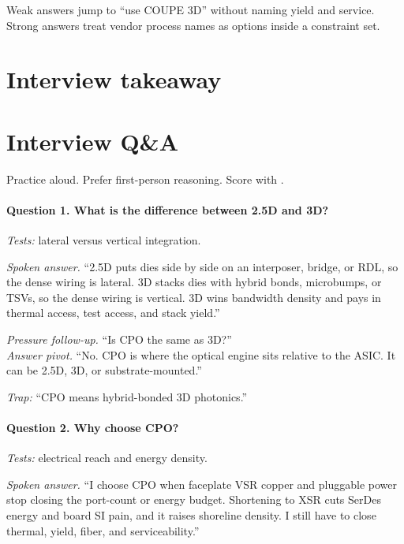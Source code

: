 Weak answers jump to ``use COUPE 3D'' without naming yield and service. Strong
answers treat vendor process names as options inside a constraint set.

\section{Interview takeaway}
\label{sec:pkg-design-review}


\section{Interview Q\&A}
\label{sec:pkg-interview-qa}

Practice aloud. Prefer first-person reasoning. Score with
.

\paragraph{Question 1. What is the difference between 2.5D and 3D?}
\textit{Tests:} lateral versus vertical integration.

\textit{Spoken answer.}
``2.5D puts dies side by side on an interposer, bridge, or RDL, so the dense
wiring is lateral. 3D stacks dies with hybrid bonds, microbumps, or TSVs, so
the dense wiring is vertical. 3D wins bandwidth density and pays in thermal
access, test access, and stack yield.''

\textit{Pressure follow-up.} ``Is CPO the same as 3D?''\\
\textit{Answer pivot.} ``No. CPO is where the optical engine sits relative to
the ASIC. It can be 2.5D, 3D, or substrate-mounted.''

\textit{Trap:} ``CPO means hybrid-bonded 3D photonics.''

\paragraph{Question 2. Why choose CPO?}
\textit{Tests:} electrical reach and energy density.

\textit{Spoken answer.}
``I choose CPO when faceplate VSR copper and pluggable power stop closing the
port-count or energy budget. Shortening to XSR cuts SerDes energy and board SI
pain, and it raises shoreline density. I still have to close thermal, yield,
fiber, and serviceability.''

